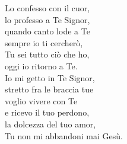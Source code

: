 
 

\spazio

Lo confesso con il cuor,\\
lo professo a Te Signor,\\
quando canto lode a Te\\
sempre io ti cercherò,\\
Tu sei tutto ciò che ho,\\
oggi io ritorno a Te.\\
Io mi getto in Te Signor,\\
stretto fra le braccia tue\\
voglio vivere con Te\\
e ricevo il tuo perdono,\\
la dolcezza del tuo amor,\\
Tu non mi abbandoni mai Gesù.

\spazio


